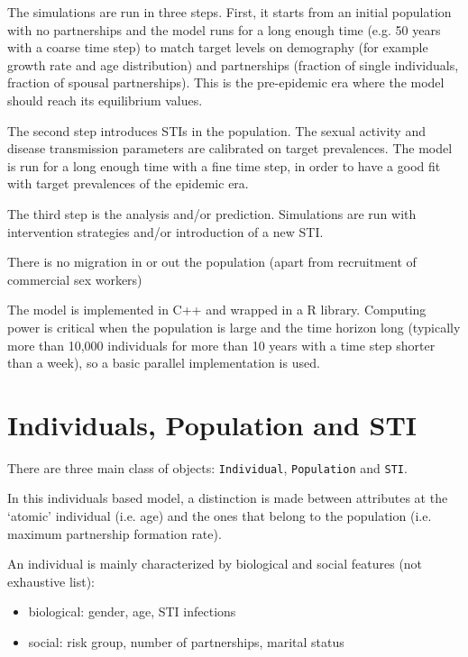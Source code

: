 \documentclass[11pt, onecolumn]{article}
\newcommand{\ttt}[1]{\texttt{#1}}
\begin{document}
The simulations are run in three steps. First, it starts from an initial population with no partnerships and the model runs for a long enough time (e.g. 50 years with a coarse time step) to match target levels on demography (for example growth rate and age distribution) and partnerships (fraction of single individuals, fraction of spousal partnerships). This is the pre-epidemic era where the model should reach its equilibrium values.

The second step introduces STIs in the population. The sexual activity and disease transmission parameters are calibrated on target prevalences. The model is run for a long enough time with a fine time step, in order to have a good fit with target prevalences of the epidemic era. 

The third step is the analysis and/or prediction. Simulations are run with intervention strategies and/or introduction of a new STI.

There is no migration in or out the population (apart from recruitment of commercial sex workers)

The model is implemented in C++ and wrapped in a R library. Computing power is critical when the population is large and the time horizon long (typically more than 10,000 individuals for more than 10 years with a time step shorter than a week), so a basic parallel implementation is used. 




\section{Individuals, Population and STI}

There are three main class of objects: \ttt{Individual}, \ttt{Population} and \ttt{STI}.

In this individuals based model, a distinction is made between attributes at the `atomic' individual (i.e. age) and the ones that belong to the population (i.e. maximum partnership formation rate). 

An individual is mainly characterized by biological and social features (not exhaustive list): 
\begin{itemize}
\item biological: gender, age, STI infections
\item social: risk group, number of partnerships, marital status
\end{itemize}
\end{document}
